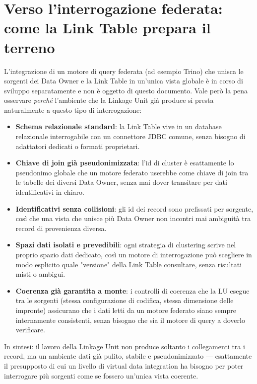 \documentclass[11pt,a4paper]{article}
\begin{document}
\section{Verso l'interrogazione federata: come la Link Table prepara il terreno}

L'integrazione di un motore di query federata (ad esempio Trino) che unisca le
sorgenti dei Data Owner e la Link Table in un'unica vista globale \`e in corso
di sviluppo separatamente e non \`e oggetto di questo documento. Vale per\`o la
pena osservare \emph{perch\'e} l'ambiente che la Linkage Unit gi\`a produce si
presta naturalmente a questo tipo di interrogazione:

\begin{itemize}
    \item \textbf{Schema relazionale standard}: la Link Table vive in un
        database relazionale interrogabile con un connettore JDBC comune, senza
        bisogno di adattatori dedicati o formati proprietari.
    \item \textbf{Chiave di join gi\`a pseudonimizzata}: l'id di cluster \`e
        esattamente lo pseudonimo globale che un motore federato userebbe come
        chiave di join tra le tabelle dei diversi Data Owner, senza mai dover
        transitare per dati identificativi in chiaro.
    \item \textbf{Identificativi senza collisioni}: gli id dei record sono
        prefissati per sorgente, cos\`i che una vista che unisce pi\`u Data
        Owner non incontri mai ambiguit\`a tra record di provenienza diversa.
    \item \textbf{Spazi dati isolati e prevedibili}: ogni strategia di
        clustering scrive nel proprio spazio dati dedicato, cos\`i un motore
        di interrogazione pu\`o scegliere in modo esplicito quale "versione"
        della Link Table consultare, senza risultati misti o ambigui.
    \item \textbf{Coerenza gi\`a garantita a monte}: i controlli di coerenza
        che la LU esegue tra le sorgenti (stessa configurazione di codifica,
        stessa dimensione delle impronte) assicurano che i dati letti da un
        motore federato siano sempre internamente consistenti, senza bisogno
        che sia il motore di query a doverlo verificare.
\end{itemize}

In sintesi: il lavoro della Linkage Unit non produce soltanto i collegamenti
tra i record, ma un ambiente dati gi\`a pulito, stabile e pseudonimizzato ---
esattamente il presupposto di cui un livello di virtual data integration ha
bisogno per poter interrogare pi\`u sorgenti come se fossero un'unica vista
coerente.
\end{document}
